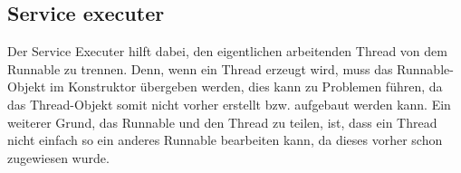 \subsection{Service executer}
Der Service Executer hilft dabei, den eigentlichen arbeitenden Thread von dem Runnable zu trennen. Denn, wenn ein Thread erzeugt wird, muss das Runnable-Objekt im Konstruktor übergeben werden, dies kann zu Problemen führen, da das Thread-Objekt somit nicht vorher erstellt bzw. aufgebaut werden kann. Ein weiterer Grund, das Runnable und den Thread zu teilen, ist, dass ein Thread nicht einfach so ein anderes Runnable bearbeiten kann, da dieses vorher schon zugewiesen wurde.
\cite{javaInselBuch}
 
 
 

